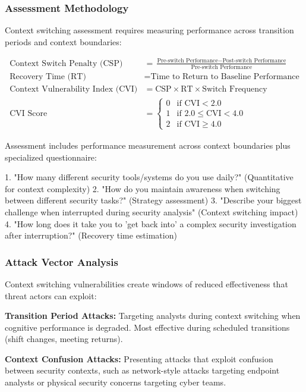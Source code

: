 \documentclass[11pt,a4paper]{article}
\begin{document}
\subsubsection{Assessment Methodology}

Context switching assessment requires measuring performance across transition periods and context boundaries:

\begin{align}
\text{Context Switch Penalty (CSP)} &= \frac{\text{Pre-switch Performance} - \text{Post-switch Performance}}{\text{Pre-switch Performance}} \\
\text{Recovery Time (RT)} &= \text{Time to Return to Baseline Performance} \\
\text{Context Vulnerability Index (CVI)} &= \text{CSP} \times \text{RT} \times \text{Switch Frequency} \\
\text{CVI Score} &= \begin{cases}
0 & \text{if CVI} < 2.0 \\
1 & \text{if } 2.0 \leq \text{CVI} < 4.0 \\
2 & \text{if CVI} \geq 4.0
\end{cases}
\end{align}

Assessment includes performance measurement across context boundaries plus specialized questionnaire:

1. "How many different security tools/systems do you use daily?" (Quantitative for context complexity)
2. "How do you maintain awareness when switching between different security tasks?" (Strategy assessment)
3. "Describe your biggest challenge when interrupted during security analysis" (Context switching impact)
4. "How long does it take you to 'get back into' a complex security investigation after interruption?" (Recovery time estimation)

\subsubsection{Attack Vector Analysis}

Context switching vulnerabilities create windows of reduced effectiveness that threat actors can exploit:

\textbf{Transition Period Attacks:} Targeting analysts during context switching when cognitive performance is degraded. Most effective during scheduled transitions (shift changes, meeting returns).

\textbf{Context Confusion Attacks:} Presenting attacks that exploit confusion between security contexts, such as network-style attacks targeting endpoint analysts or physical security concerns targeting cyber teams.
\end{document}
